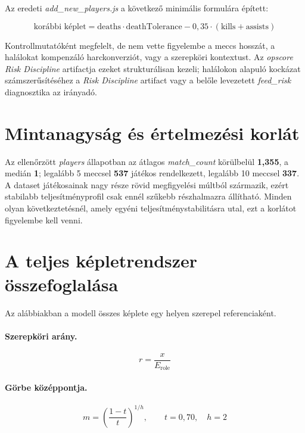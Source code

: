 Az eredeti \textit{add\_new\_players.js} a következő minimális formulára épített:

\begin{equation}
\text{korábbi képlet} = \text{deaths} \cdot \text{deathTolerance} - 0{,}35 \cdot (\text{kills} + \text{assists})
\end{equation}

Kontrollmutatóként megfelelt, de nem vette figyelembe a meccs hosszát, a halálokat kompenzáló harckonverziót, vagy a szerepköri kontextust. Az \textit{opscore} \textit{Risk Discipline} artifactja ezeket strukturálisan kezeli; halálokon alapuló kockázat számszerűsítéséhez a \textit{Risk Discipline} artifact vagy a belőle levezetett \textit{feed\_risk} diagnosztika az irányadó.

\section{Mintanagyság és értelmezési korlát}

Az ellenőrzött \textit{players} állapotban az átlagos \textit{match\_count} körülbelül \textbf{1{,}355}, a medián \textbf{1}; legalább 5 meccsel \textbf{537} játékos rendelkezett, legalább 10 meccsel \textbf{337}. A dataset játékosainak nagy része rövid megfigyelési múltból származik, ezért stabilabb teljesítményprofil csak ennél szűkebb részhalmazra állítható. Minden olyan következtetésnél, amely egyéni teljesítménystabilitásra utal, ezt a korlátot figyelembe kell venni.

\section{A teljes képletrendszer összefoglalása}

Az alábbiakban a modell összes képlete egy helyen szerepel referenciaként.

\paragraph{Szerepköri arány.}
\begin{equation}
r = \frac{x}{E_{\text{role}}}
\end{equation}

\paragraph{Görbe középpontja.}
\begin{equation}
m = \left(\frac{1-t}{t}\right)^{1/h}, \qquad t = 0{,}70,\quad h = 2
\end{equation}

